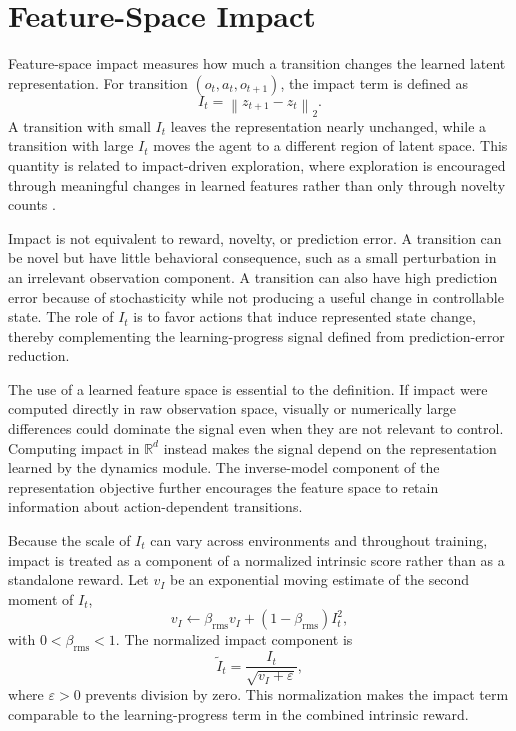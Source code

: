 \section{Feature-Space Impact}
\label{sec:feature_space_impact}

Feature-space impact measures how much a transition changes the learned latent representation.
For transition $(o_t,a_t,o_{t+1})$, the impact term is defined as
\begin{equation}
    I_t=\left\lVert z_{t+1}-z_t\right\rVert_2.
    \label{eq:feature_space_impact}
\end{equation}
A transition with small $I_t$ leaves the representation nearly unchanged, while a transition with large $I_t$ moves the agent to a different region of latent space.
This quantity is related to impact-driven exploration, where exploration is encouraged through meaningful changes in learned features rather than only through novelty counts \parencite{raileanu-2020}.

Impact is not equivalent to reward, novelty, or prediction error.
A transition can be novel but have little behavioral consequence, such as a small perturbation in an irrelevant observation component.
A transition can also have high prediction error because of stochasticity while not producing a useful change in controllable state.
The role of $I_t$ is to favor actions that induce represented state change, thereby complementing the learning-progress signal defined from prediction-error reduction.

The use of a learned feature space is essential to the definition.
If impact were computed directly in raw observation space, visually or numerically large differences could dominate the signal even when they are not relevant to control.
Computing impact in $\mathbb{R}^{d}$ instead makes the signal depend on the representation learned by the dynamics module.
The inverse-model component of the representation objective further encourages the feature space to retain information about action-dependent transitions.

Because the scale of $I_t$ can vary across environments and throughout training, impact is treated as a component of a normalized intrinsic score rather than as a standalone reward.
Let $v_I$ be an exponential moving estimate of the second moment of $I_t$,
\begin{equation}
    v_I \leftarrow \beta_{\mathrm{rms}}v_I+(1-\beta_{\mathrm{rms}})I_t^2,
\end{equation}
with $0<\beta_{\mathrm{rms}}<1$.
The normalized impact component is
\begin{equation}
    \widetilde{I}_t=\frac{I_t}{\sqrt{v_I+\varepsilon}},
\end{equation}
where $\varepsilon>0$ prevents division by zero.
This normalization makes the impact term comparable to the learning-progress term in the combined intrinsic reward.